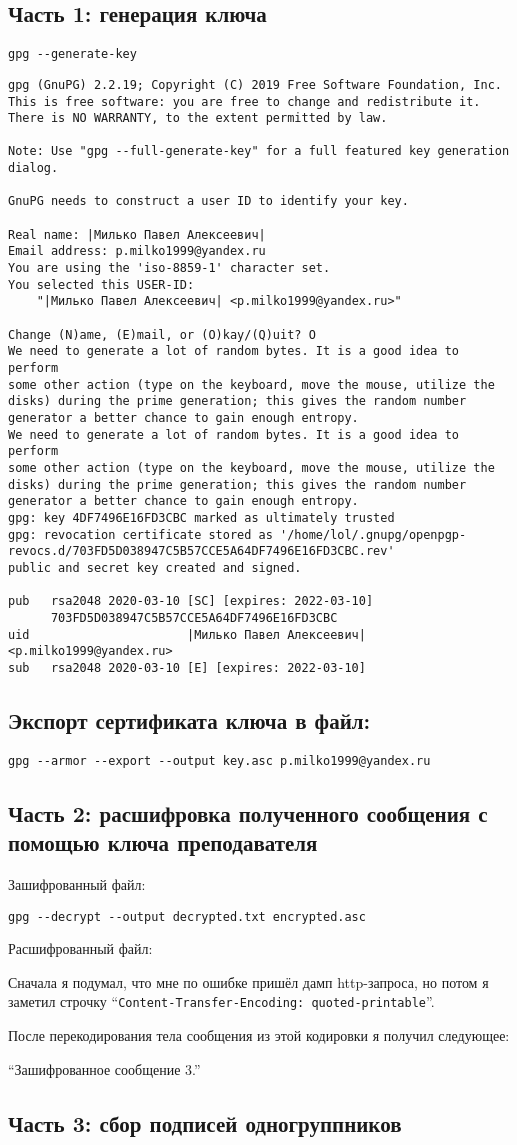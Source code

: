 \documentclass[12pt]{article}
\newcommand{\pa}[1]{\subsection*{\bf #1}}
\newcommand{\printPlain}[1]{\smallbreak{\large \bf  #1}
	{\scriptsize
		\setlength{\parindent}{0pt}
		
	}
}
\begin{document}
\pa{Часть 1: генерация ключа}

\lstinline|gpg --generate-key|

{\scriptsize
\begin{lstlisting}[escapechar=|,breaklines=true]
gpg (GnuPG) 2.2.19; Copyright (C) 2019 Free Software Foundation, Inc.
This is free software: you are free to change and redistribute it.
There is NO WARRANTY, to the extent permitted by law.

Note: Use "gpg --full-generate-key" for a full featured key generation dialog.

GnuPG needs to construct a user ID to identify your key.

Real name: |Милько Павел Алексеевич|
Email address: p.milko1999@yandex.ru
You are using the 'iso-8859-1' character set.
You selected this USER-ID:
    "|Милько Павел Алексеевич| <p.milko1999@yandex.ru>"

Change (N)ame, (E)mail, or (O)kay/(Q)uit? O
We need to generate a lot of random bytes. It is a good idea to perform
some other action (type on the keyboard, move the mouse, utilize the
disks) during the prime generation; this gives the random number
generator a better chance to gain enough entropy.
We need to generate a lot of random bytes. It is a good idea to perform
some other action (type on the keyboard, move the mouse, utilize the
disks) during the prime generation; this gives the random number
generator a better chance to gain enough entropy.
gpg: key 4DF7496E16FD3CBC marked as ultimately trusted
gpg: revocation certificate stored as '/home/lol/.gnupg/openpgp-revocs.d/703FD5D038947C5B57CCE5A64DF7496E16FD3CBC.rev'
public and secret key created and signed.

pub   rsa2048 2020-03-10 [SC] [expires: 2022-03-10]
      703FD5D038947C5B57CCE5A64DF7496E16FD3CBC
uid                      |Милько Павел Алексеевич| <p.milko1999@yandex.ru>
sub   rsa2048 2020-03-10 [E] [expires: 2022-03-10]
\end{lstlisting}
}

\pa{Экспорт сертификата ключа в файл:}
\lstinline|gpg --armor --export --output key.asc p.milko1999@yandex.ru|
\printPlain{key.asc}

\pa{Часть 2: расшифровка полученного сообщения с помощью ключа преподавателя}
Зашифрованный файл:

\printPlain{t3/encrypted.asc}

\noindent \lstinline|gpg --decrypt --output decrypted.txt encrypted.asc|
\smallbreak

\noindent Расшифрованный файл:

\printPlain{t3/decrypted.txt}

Сначала я подумал, что мне по ошибке пришёл дамп http-запроса, но потом я заметил строчку ``\lstinline|Content-Transfer-Encoding: quoted-printable|''.

После перекодирования тела сообщения из этой кодировки я получил следующее:

``Зашифрованное сообщение 3.''

\pa{Часть 3: сбор подписей одногруппников}
\end{document}
